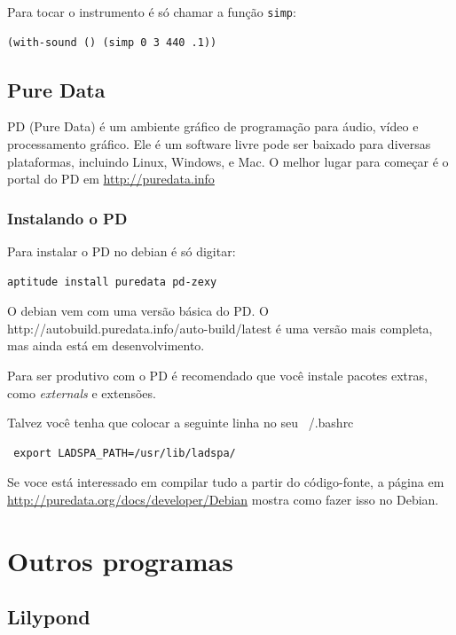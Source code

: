\documentclass[12pt,brazil]{book}
\begin{document}
Para tocar o instrumento é só chamar a função \texttt{simp}:

\begin{verbatim}
(with-sound () (simp 0 3 440 .1))
\end{verbatim}

\chapter{Pure Data}
\label{cha:pure-data}

PD (Pure Data) é um ambiente gráfico de programação para áudio, vídeo
e processamento gráfico. Ele é um software livre pode ser baixado para
diversas plataformas, incluindo Linux, Windows, e Mac. O melhor lugar
para começar é o portal do PD em \url{http://puredata.info}

\section{Instalando o PD}

Para instalar o PD no debian é só digitar:

\begin{verbatim}
aptitude install puredata pd-zexy
\end{verbatim}

O debian vem com uma versão básica do PD. O
{http://autobuild.puredata.info/auto-build/latest} é uma versão mais
completa, mas ainda está em desenvolvimento.

Para ser produtivo com o PD é recomendado que você instale pacotes
extras, como \textit{externals} e extensões.

Talvez você tenha que colocar a seguinte linha no seu ~/.bashrc

\begin{verbatim}
 export LADSPA_PATH=/usr/lib/ladspa/
\end{verbatim}

Se voce está interessado em compilar tudo a partir do código-fonte, a
página em \url{http://puredata.org/docs/developer/Debian} mostra como
fazer isso no Debian.

\part{Outros programas}
\label{part:outros-programas}

\chapter{Lilypond}
\label{sec:lilypond}
\end{document}
